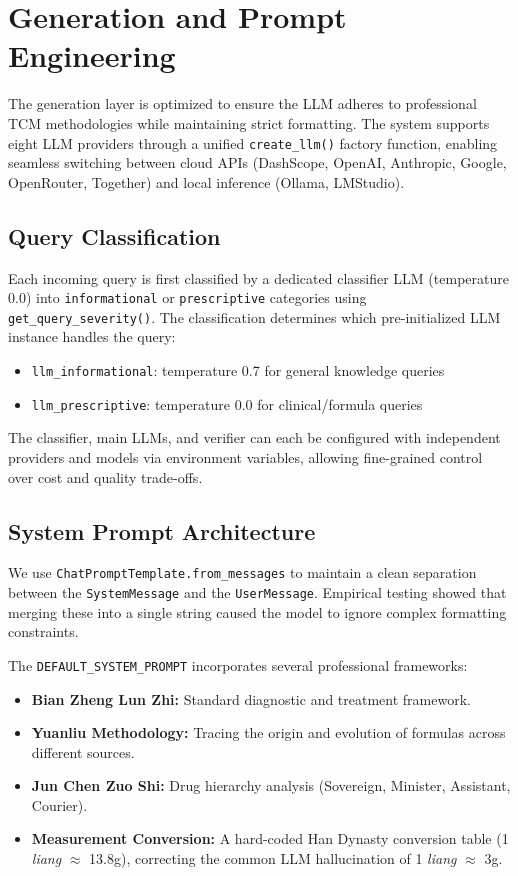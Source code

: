 \section{Generation and Prompt Engineering}

The generation layer is optimized to ensure the LLM adheres to professional TCM methodologies while maintaining strict formatting. The system supports eight LLM providers through a unified \texttt{create\_llm()} factory function, enabling seamless switching between cloud APIs (DashScope, OpenAI, Anthropic, Google, OpenRouter, Together) and local inference (Ollama, LMStudio).

\subsection{Query Classification}
Each incoming query is first classified by a dedicated classifier LLM (temperature 0.0) into \texttt{informational} or \texttt{prescriptive} categories using \texttt{get\_query\_severity()}. The classification determines which pre-initialized LLM instance handles the query:

\begin{itemize}
    \item \texttt{llm\_informational}: temperature 0.7 for general knowledge queries
    \item \texttt{llm\_prescriptive}: temperature 0.0 for clinical/formula queries
\end{itemize}

The classifier, main LLMs, and verifier can each be configured with independent providers and models via environment variables, allowing fine-grained control over cost and quality trade-offs.

\subsection{System Prompt Architecture}
We use \texttt{ChatPromptTemplate.from_messages} to maintain a clean separation between the \texttt{SystemMessage} and the \texttt{UserMessage}. Empirical testing showed that merging these into a single string caused the model to ignore complex formatting constraints.

The \texttt{DEFAULT\_SYSTEM\_PROMPT} incorporates several professional frameworks:
\begin{itemize}
    \item \textbf{Bian Zheng Lun Zhi:} Standard diagnostic and treatment framework.
    \item \textbf{Yuanliu Methodology:} Tracing the origin and evolution of formulas across different sources.
    \item \textbf{Jun Chen Zuo Shi:} Drug hierarchy analysis (Sovereign, Minister, Assistant, Courier).
    \item \textbf{Measurement Conversion:} A hard-coded Han Dynasty conversion table (1 \textit{liang} $\approx$ 13.8g), correcting the common LLM hallucination of 1 \textit{liang} $\approx$ 3g.
\end{itemize}

